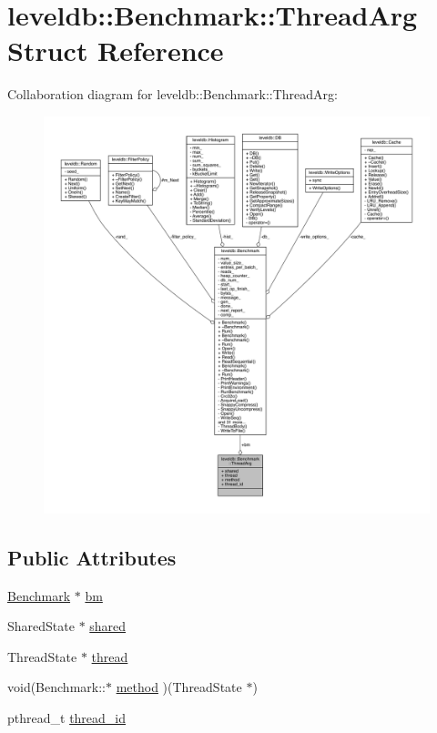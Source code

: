 \hypertarget{structleveldb_1_1_benchmark_1_1_thread_arg}{}\section{leveldb\+:\+:Benchmark\+:\+:Thread\+Arg Struct Reference}
\label{structleveldb_1_1_benchmark_1_1_thread_arg}


Collaboration diagram for leveldb\+:\+:Benchmark\+:\+:Thread\+Arg\+:
\nopagebreak
\begin{figure}[H]
\begin{center}
\leavevmode
\includegraphics[width=350pt]{structleveldb_1_1_benchmark_1_1_thread_arg__coll__graph}
\end{center}
\end{figure}
\subsection*{Public Attributes}
\begin{DoxyCompactItemize}
\item 
\hyperlink{classleveldb_1_1_benchmark}{Benchmark} $\ast$ \hyperlink{structleveldb_1_1_benchmark_1_1_thread_arg_a12d3836200f9c5e6495b5adc3626fdfc}{bm}
\item 
Shared\+State $\ast$ \hyperlink{structleveldb_1_1_benchmark_1_1_thread_arg_a655e31754ac547d299f1bccba169414a}{shared}
\item 
Thread\+State $\ast$ \hyperlink{structleveldb_1_1_benchmark_1_1_thread_arg_aad6ba56c77f3da2d369a032e211c92d8}{thread}
\item 
void(Benchmark\+::$\ast$ \hyperlink{structleveldb_1_1_benchmark_1_1_thread_arg_aee26111ca3542d6008ee5ca1d8bd7250}{method} )(Thread\+State $\ast$)
\item 
pthread\+\_\+t \hyperlink{structleveldb_1_1_benchmark_1_1_thread_arg_abcb95247c2596d3911b668d63460ea28}{thread\+\_\+id}
\end{DoxyCompactItemize}


